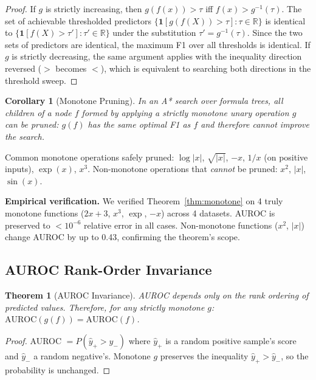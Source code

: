\documentclass[journal]{IEEEtran}
\newtheorem{theorem}{Theorem}
\newtheorem{corollary}{Corollary}
\begin{document}
\begin{proof}
If $g$ is strictly increasing, then $g(f(x)) > \tau$ iff
$f(x) > g^{-1}(\tau)$. The set of achievable thresholded predictors
$\{\mathbf{1}[g(f(X)) > \tau] : \tau \in \mathbb{R}\}$ is identical
to $\{\mathbf{1}[f(X) > \tau'] : \tau' \in \mathbb{R}\}$ under the
substitution $\tau' = g^{-1}(\tau)$. Since the two sets of predictors
are identical, the maximum F1 over all thresholds is identical.
If $g$ is strictly decreasing, the same argument applies with the
inequality direction reversed ($>$ becomes $<$), which is equivalent
to searching both directions in the threshold sweep.
\end{proof}

\begin{corollary}[Monotone Pruning]
In an A* search over formula trees, all children of a node $f$
formed by applying a strictly monotone unary operation $g$ can be
pruned: $g(f)$ has the same optimal F1 as $f$ and therefore
cannot improve the search.
\end{corollary}

Common monotone operations safely pruned: $\log|x|$, $\sqrt{|x|}$,
$-x$, $1/x$ (on positive inputs), $\exp(x)$, $x^3$.
Non-monotone operations that \emph{cannot} be pruned: $x^2$, $|x|$,
$\sin(x)$.

\textbf{Empirical verification.} We verified Theorem~\ref{thm:monotone}
on 4 truly monotone functions ($2x{+}3$, $x^3$, $\exp$, $-x$) across
4 datasets. AUROC is preserved to $< 10^{-6}$ relative error in all
cases. Non-monotone functions ($x^2$, $|x|$) change AUROC by up to
0.43, confirming the theorem's scope.

\subsection{AUROC Rank-Order Invariance}

\begin{theorem}[AUROC Invariance]
\label{thm:auroc}
AUROC depends only on the rank ordering of predicted values. Therefore,
for any strictly monotone $g$: $\mathrm{AUROC}(g(f)) = \mathrm{AUROC}(f)$.
\end{theorem}

\begin{proof}
AUROC $= P(\hat{y}_+ > \hat{y}_-)$ where $\hat{y}_+$ is a random
positive sample's score and $\hat{y}_-$ a random negative's. Monotone
$g$ preserves the inequality $\hat{y}_+ > \hat{y}_-$, so the
probability is unchanged.
\end{proof}
\end{document}
